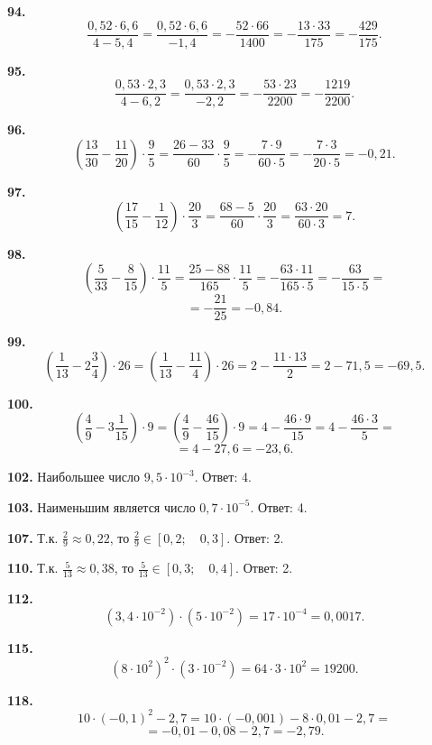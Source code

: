 \textbf{94.} $$\frac{0,52\cdot6,6}{4-5,4}=\frac{0,52\cdot6,6}{-1,4}=-\frac{52\cdot66}{1400}=-\frac{13\cdot33}{175}=-\frac{429}{175}.$$

\textbf{95.} $$\frac{0,53\cdot2,3}{4-6,2}=\frac{0,53\cdot2,3}{-2,2}=-\frac{53\cdot23}{2200}=-\frac{1219}{2200}.$$

\textbf{96.} $$\left(\frac{13}{30}-\frac{11}{20}\right)\cdot\frac{9}{5}=\frac{26-33}{60}\cdot\frac{9}{5}=-\frac{7\cdot9}{60\cdot5}=-\frac{7\cdot3}{20\cdot5}=-0,21.$$

\textbf{97.} $$\left(\frac{17}{15}-\frac{1}{12}\right)\cdot\frac{20}{3}=\frac{68-5}{60}\cdot\frac{20}{3}=\frac{63\cdot20}{60\cdot3}=7.$$

\textbf{98.} $$\left(\frac{5}{33}-\frac{8}{15}\right)\cdot\frac{11}{5}=\frac{25-88}{165}\cdot\frac{11}{5}=-\frac{63\cdot11}{165\cdot5}=-\frac{63}{15\cdot5}=$$ $$=-\frac{21}{25}=-0,84.$$

 \textbf{99.} $$\left(\frac{1}{13}-2\frac{3}{4}\right)\cdot26=\left(\frac{1}{13}-\frac{11}{4}\right)\cdot26=2-\frac{11\cdot13}{2}=2-71,5=-69,5.$$

\newpage \textbf{100.} $$\left(\frac{4}{9}-3\frac{1}{15}\right)\cdot9=\left(\frac{4}{9}-\frac{46}{15}\right)\cdot9=4-\frac{46\cdot9}{15}=4-\frac{46\cdot3}{5}=$$ $$=4-27,6=-23,6.$$

\textbf{102.} Наибольшее число $9,5\cdot10^{-3}$. \newline \null \hspace*{\fill} Ответ: 4. 

\textbf{103.} Наименьшим является число $0,7\cdot10^{-5}$. \newline \null \hspace*{\fill} Ответ: 4. 

\textbf{107.} Т.к. $\frac{2}{9}\approx0,22$, то $\frac{2}{9}\in[0,2;\quad0,3]$. \newline \null \hspace*{\fill} Ответ: 2. 

\textbf{110.} Т.к. $\frac{5}{13}\approx0,38$, то $\frac{5}{13}\in[0,3;\quad0,4]$.  \newline \null \hspace*{\fill} Ответ: 2. 

\textbf{112.} $$\left(3,4\cdot10^{-2}\right)\cdot\left(5\cdot10^{-2}\right)=17\cdot10^{-4}=0,0017.$$

\textbf{115.} $$\left(8\cdot10^2\right)^2\cdot\left(3\cdot10^{-2}\right)=64\cdot3\cdot10^2=19200.$$

\textbf{118.} $$10\cdot\left(-0,1\right)^2-2,7=10\cdot\left(-0,001\right)-8\cdot0,01-2,7=$$ $$=-0,01-0,08-2,7=-2,79.$$    

